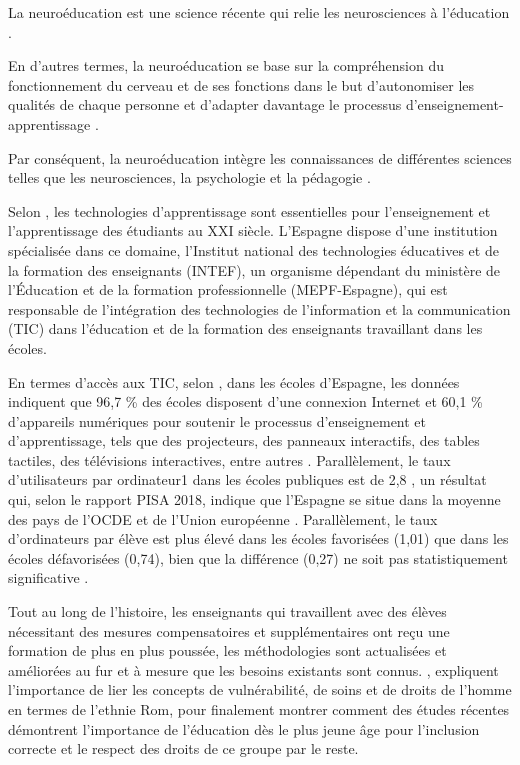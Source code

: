 \documentclass[french]{textolivre}
\begin{document}
La neuroéducation est une science récente qui relie les neurosciences à l'éducation \cite{hernández_inclusion_2021}.

En d'autres termes, la neuroéducation se base sur la compréhension du fonctionnement du cerveau et de ses fonctions dans le but d'autonomiser les qualités de chaque personne et d'adapter davantage le processus d'enseignement-apprentissage \cite{orbe_aplicacion_2019}.

Par conséquent, la neuroéducation intègre les connaissances de différentes sciences telles que les neurosciences, la psychologie et la pédagogie \cite{hernandez_martinez_neuroeducacion_2020}.

Selon \textcite{romero_rodriguez_tecnologias_2020}, les technologies d’apprentissage sont essentielles pour l’enseignement et l’apprentissage des étudiants au XXI siècle.  L'Espagne dispose d'une institution spécialisée dans ce domaine, l'Institut national des technologies éducatives et de la formation des enseignants (INTEF), un organisme dépendant du ministère de l'Éducation et de la formation professionnelle (MEPF-Espagne), qui est responsable de l'intégration des technologies de l’information et la communication (TIC) dans l'éducation et de la formation des enseignants travaillant dans les écoles.

En termes d'accès aux TIC, selon \textcite{acevedo_ciencia_1998}, dans les écoles d'Espagne, les données indiquent que 96,7 \% des écoles disposent d'une connexion Internet et 60,1 \% d'appareils numériques pour soutenir le processus d'enseignement et d'apprentissage, tels que des projecteurs, des panneaux interactifs, des tables tactiles, des télévisions interactives, entre autres \cite{mepf-espana_datos_2021}. Parallèlement, le taux d'utilisateurs par ordinateur1 dans les écoles publiques est de 2,8 \cite{mepf-espana_datos_2021}, un résultat qui, selon le rapport PISA 2018, indique que l'Espagne se situe dans la moyenne des pays de l'OCDE et de l'Union européenne \cite{mepf-espana_pisa_2020}. Parallèlement, le taux d'ordinateurs par élève est plus élevé dans les écoles favorisées (1,01) que dans les écoles défavorisées (0,74), bien que la différence (0,27) ne soit pas statistiquement significative \cite{mepf-espana_pisa_2020}.

Tout au long de l'histoire, les enseignants qui travaillent avec des élèves nécessitant des mesures compensatoires et supplémentaires ont reçu une formation de plus en plus poussée, les méthodologies sont actualisées et améliorées au fur et à mesure que les besoins existants sont connus. \textcite{carmona_santiago_colaboracion_2021}, expliquent l'importance de lier les concepts de vulnérabilité, de soins et de droits de l'homme en termes de l'ethnie Rom, pour finalement montrer comment des études récentes démontrent l'importance de l'éducation dès le plus jeune âge pour l'inclusion correcte et le respect des droits de ce groupe par le reste.
\end{document}
